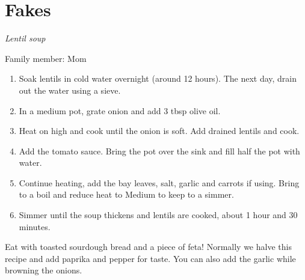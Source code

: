 \chapter{Fakes}
\label{ch:fakes}


\textit{Lentil soup}

Family member: Mom

\begin{enumerate}
    \item Soak lentils in cold water overnight (around 12 hours). The next day, drain out the water using a sieve.
    \item In a medium pot, grate onion and add 3 tbsp olive oil.
    \item Heat on high and cook until the onion is soft. Add drained lentils and cook.
    \item Add the tomato sauce. Bring the pot over the sink and fill half the pot with water.
    \item Continue heating, add the bay leaves, salt, garlic and carrots if using. Bring to a boil and reduce heat to Medium to keep to a simmer.
    \item Simmer until the soup thickens and lentils are cooked, about 1 hour and 30 minutes.
\end{enumerate}

Eat with toasted sourdough bread and a piece of feta! Normally we halve this recipe and add paprika and pepper for taste. You can also add the garlic while browning the onions.
